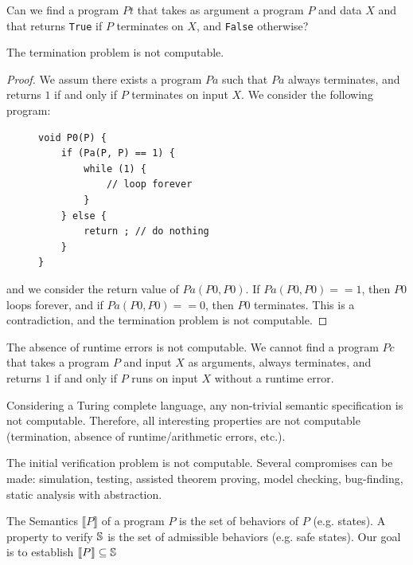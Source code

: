 \documentclass[toc, titlepaged]{../cs-classes/cs-classes}
\begin{document}
\begin{definition}
    Can we find a program $Pt$ that takes as argument a program $P$ and data $X$ and that returns \texttt{True} if $P$ terminates on $X$, and \texttt{False} otherwise?
\end{definition}

\begin{property}
    The termination problem is not computable.
\end{property}
\begin{proof}
    We assum there exists a program $Pa$ such that $Pa$ always terminates, and returns $1$ if and only if $P$ terminates on input $X$. We consider the following program:
    \begin{figure}[H]
    \centering
    \begin{minipage}{0.4\textwidth}
    \begin{verbatim}
void P0(P) {
    if (Pa(P, P) == 1) {
        while (1) {
            // loop forever
        }
    } else {
        return ; // do nothing
    }
}
    \end{verbatim}
    \end{minipage}
    \end{figure}
    \noindent and we consider the return value of $Pa(P0, P0)$. If $Pa(P0, P0) == 1$, then $P0$ loops forever, and if $Pa(P0, P0) == 0$, then $P0$ terminates. This is a contradiction, and the termination problem is not computable.
\end{proof}

\begin{property}
    The absence of runtime errors is not computable. We cannot find a program $Pc$ that takes a program $P$ and input $X$ as arguments, always terminates, and returns $1$ if and only if $P$ runs on input $X$ without a runtime error.
\end{property}

\begin{theorem}
    Considering a Turing complete language, any non-trivial semantic specification is not computable. Therefore, all interesting properties are not computable (termination, absence of runtime/arithmetic errors, etc.).
\end{theorem}

The initial verification problem is not computable. Several compromises can be made: simulation, testing, assisted theorem proving, model checking, bug-finding, static analysis with abstraction.

\begin{definition}
    The Semantics $\llbracket P\rrbracket$ of a program $P$ is the set of behaviors of $P$ (e.g. states). A property to verify $\S$ is the set of admissible behaviors (e.g. safe states). Our goal is to establish $\llbracket P\rrbracket \subseteq \S$
\end{definition}
\end{document}
